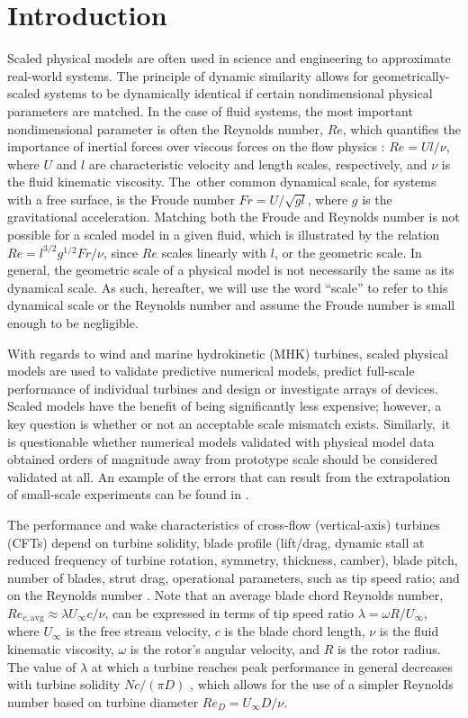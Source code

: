 \documentclass[energies,article,accept,moreauthors,pdftex,10pt,a4paper]{mdpi}
\theoremstyle{mdpi}
\newcounter{ex}
\newcounter{re}
\begin{document}
\section{Introduction}

Scaled physical models are often used in science and engineering to approximate
real-world systems. The principle of dynamic similarity allows for
geometrically-scaled systems to be dynamically identical if certain
nondimensional physical parameters are matched. In the case of fluid systems,
the most important nondimensional parameter is often the Reynolds number, $Re$,
which quantifies the importance of inertial forces over viscous forces on the
flow physics \cite{Acheson1990}: $Re = Ul/\nu$, where $U$ and $l$ are
characteristic velocity and length scales, respectively, and $\nu$ is the fluid
kinematic viscosity. The~other common dynamical scale, for systems with a free
surface, is the Froude number $Fr = U/\sqrt{gl}$, where $g$ is the gravitational
acceleration. Matching both the Froude and Reynolds number is not possible for a
scaled model in a given fluid, which is illustrated by the relation $Re =
l^{3/2} g^{1/2} Fr / \nu$, since $Re$ scales linearly with $l$, or the geometric
scale. In general, the geometric scale of a physical model is not necessarily
the same as its dynamical scale. As such, hereafter, we will use the word
``scale'' to refer to this dynamical scale or the Reynolds number and assume the
Froude number is small enough to be negligible.

With regards to wind and marine hydrokinetic (MHK) turbines, scaled physical
models are used to validate predictive numerical models, predict full-scale
performance of individual turbines and design or investigate arrays of devices.
Scaled models have the benefit of being significantly less expensive; however, a
key question is whether or not an acceptable scale mismatch exists.
Similarly,~it is questionable whether numerical models validated with physical
model data obtained orders of magnitude away from prototype scale should be
considered validated at all. An example of the errors that can result from the
extrapolation of small-scale experiments can be found in \cite{Baker1991}.

The performance and wake characteristics of cross-flow (vertical-axis) turbines
(CFTs) depend on turbine solidity, blade profile (lift/drag, dynamic stall at
reduced frequency of turbine rotation, symmetry, thickness, camber), blade
pitch, number of blades, strut drag, operational parameters, such as tip speed
ratio; and on the Reynolds number \cite{Para2002}. Note that an average blade
chord Reynolds number, $Re_{c,\mathrm{avg}} \approx \lambda U_\infty c/ \nu$,
can be expressed in terms of tip speed ratio $\lambda = \omega R/ U_\infty$,
where $U_\infty$ is the free stream velocity, $c$ is the blade chord length,
$\nu$ is the fluid kinematic viscosity, $\omega$ is the rotor's angular
velocity, and $R$ is the rotor radius. The value of $\lambda$ at which a turbine
reaches peak performance in general decreases with turbine solidity $Nc/(\pi D)$
\cite{Templin1974}, which allows for the use of a simpler Reynolds number based
on turbine diameter $Re_D = U_\infty D/\nu$.
\end{document}
